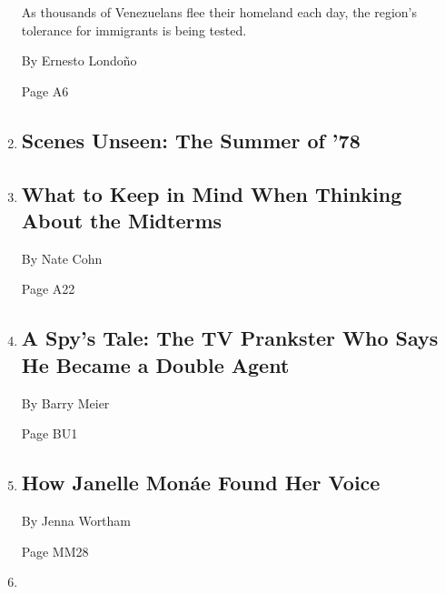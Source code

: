 \begin{enumerate}
  As thousands of Venezuelans flee their homeland each day, the region's
  tolerance for immigrants is being tested.

  By Ernesto Londoño

  Page A6
\item
  \href{/2019/03/06/admin/scenes-unseen-the-summer-of-78.html}{}

  \hypertarget{scenes-unseen-the-summer-of-78}{%
  \subsection{Scenes Unseen: The Summer of
  '78}\label{scenes-unseen-the-summer-of-78}}
\item
  \href{/2018/04/26/upshot/what-to-keep-in-mind-when-thinking-about-the-midterms.html}{}

  \hypertarget{what-to-keep-in-mind-when-thinking-about-the-midterms}{%
  \subsection{What to Keep in Mind When Thinking About the
  Midterms}\label{what-to-keep-in-mind-when-thinking-about-the-midterms}}

  By Nate Cohn

  Page A22
\item
  \href{/2018/04/27/business/corporate-spy-double-agent.html}{}

  \hypertarget{a-spys-tale-the-tv-prankster-who-says-he-became-a-double-agent}{%
  \subsection{A Spy's Tale: The TV Prankster Who Says He Became a Double
  Agent}\label{a-spys-tale-the-tv-prankster-who-says-he-became-a-double-agent}}

  By Barry Meier

  Page BU1
\item
  \href{/2018/04/19/magazine/how-janelle-monae-found-her-voice.html}{}

  \hypertarget{how-janelle-monuxe1e-found-her-voice}{%
  \subsection{How Janelle Monáe Found Her
  Voice}\label{how-janelle-monuxe1e-found-her-voice}}

  By Jenna Wortham

  Page MM28
\item
  \href{/2018/04/28/style/david-duchovny.html}{}


\end{enumerate}
